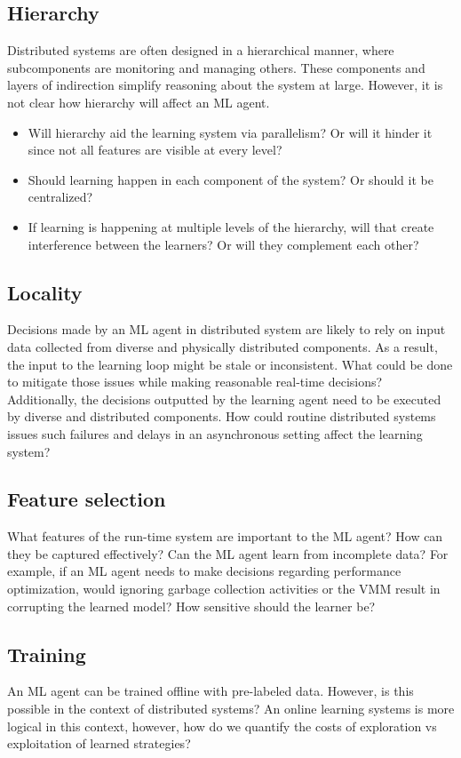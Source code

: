 \documentclass[a4paper,twocolumn]{article}
\begin{document}
\subsection*{Hierarchy}
Distributed systems are often designed in a hierarchical manner, where
subcomponents are monitoring and managing others. These components and layers of
indirection simplify reasoning about the system at large. However, it is not
clear how hierarchy will affect an ML agent.
\begin{itemize}
  \item Will hierarchy aid the learning system via parallelism? Or will it hinder
    it since not all features are visible at every level?
  \item Should learning happen in each component of the system? Or should it be
    centralized?
  \item If learning is happening at multiple levels of the hierarchy, will that
    create interference between the learners? Or will they complement each
    other?
\end{itemize}

\subsection*{Locality}
Decisions made by an ML agent in distributed system are likely to rely on input
data collected from diverse and physically distributed components. As a result,
the input to the learning loop might be stale or inconsistent. What could be
done to mitigate those issues while making reasonable real-time decisions?
Additionally, the decisions outputted by the learning agent need to be executed
by diverse and distributed components. How could routine distributed systems
issues such failures and delays in an asynchronous setting affect the learning
system?

\subsection*{Feature selection}
What features of the run-time system are important to the ML agent? How can they
be captured effectively? Can the ML agent learn from incomplete data? For
example, if an ML agent needs to make decisions regarding performance
optimization, would ignoring garbage collection activities or the VMM result in
corrupting the learned model? How sensitive should the learner be?

\subsection*{Training}
An ML agent can be trained offline with pre-labeled data. However, is this
possible in the context of distributed systems? An online learning systems is
more logical in this context, however, how do we quantify the costs of
exploration vs exploitation of learned strategies?
\end{document}

